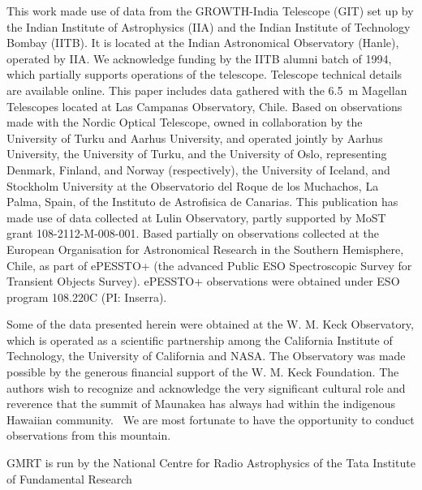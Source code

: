 \documentclass{nature_plusfigure}
\begin{document}
\begin{addendum}
This work made use of data from the GROWTH-India Telescope (GIT) set up by the Indian Institute of Astrophysics (IIA) and the Indian Institute of Technology Bombay (IITB). It is located at the Indian Astronomical Observatory (Hanle), operated by IIA. We acknowledge funding by the IITB alumni batch of 1994, which partially supports operations of the telescope. Telescope technical details are available online.\cite{growth_india}
%
This paper includes data gathered with the 6.5~m Magellan Telescopes located at Las Campanas Observatory, Chile.
%
Based on observations made with the Nordic Optical Telescope, owned in collaboration by the University of Turku and Aarhus University, and operated jointly by Aarhus University, the University of Turku, and the University of Oslo, representing Denmark, Finland, and Norway (respectively), the University of Iceland, and Stockholm University at the Observatorio del Roque de los Muchachos, La Palma, Spain, of the Instituto de Astrofisica de Canarias.
%
This publication has made use of data collected at Lulin Observatory, partly supported by MoST grant 108-2112-M-008-001.
%
Based partially on observations collected at the European Organisation for Astronomical Research in the Southern Hemisphere, Chile, as part of ePESSTO+ (the advanced Public ESO Spectroscopic Survey for Transient Objects Survey).
ePESSTO+ observations were obtained under ESO program 108.220C (PI: Inserra).


Some of the data presented herein were obtained at the W. M. Keck Observatory, which is operated as a scientific partnership among the California Institute of Technology, the University of California and NASA. The Observatory was made possible by the generous financial support of the W. M. Keck Foundation.
The authors wish to recognize and acknowledge the very significant cultural role and reverence that the summit of Maunakea has always had within the indigenous Hawaiian community.  We are most fortunate to have the opportunity to conduct observations from this mountain.

GMRT is run by the National Centre for Radio Astrophysics of the Tata Institute of Fundamental Research


\end{addendum}
\end{document}
